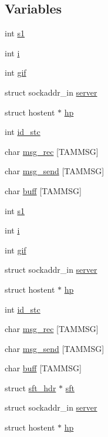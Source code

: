 \subsection*{Variables}
\begin{DoxyCompactItemize}
\item 
int \hyperlink{group__tools_gacfb6b9e2b00e34da4313b463c341e597}{s1}
\item 
int \hyperlink{group__tools_gacb559820d9ca11295b4500f179ef6392}{i}
\item 
int \hyperlink{group__tools_ga80da5edc9ed66d0e87785ab0e5d3de73}{gif}
\item 
struct sockaddr\_\-in \hyperlink{group__tools_ga437cecc27162b023659813375ca67d62}{server}
\item 
struct hostent $\ast$ \hyperlink{group__tools_gaa0f575fa3882aa394cc287edba645a35}{hp}
\item 
int \hyperlink{group__tools_gad4a4ca83bbe60e2e30bcb135a16d4ae0}{id\_\-stc}
\item 
char \hyperlink{group__tools_gaee111dc44c3bce736f7f414e0641a022}{msg\_\-rec} \mbox{[}TAMMSG\mbox{]}
\item 
char \hyperlink{group__tools_gaf535bd429e84ab4b380e215d1fda88c9}{msg\_\-send} \mbox{[}TAMMSG\mbox{]}
\item 
char \hyperlink{group__tools_gadab5417956854dcc8d2283b3d89c39de}{buff} \mbox{[}TAMMSG\mbox{]}
\item 
int \hyperlink{group__tools_gacfb6b9e2b00e34da4313b463c341e597}{s1}
\item 
int \hyperlink{group__tools_gacb559820d9ca11295b4500f179ef6392}{i}
\item 
int \hyperlink{group__tools_ga80da5edc9ed66d0e87785ab0e5d3de73}{gif}
\item 
struct sockaddr\_\-in \hyperlink{group__tools_ga437cecc27162b023659813375ca67d62}{server}
\item 
struct hostent $\ast$ \hyperlink{group__tools_gaa0f575fa3882aa394cc287edba645a35}{hp}
\item 
int \hyperlink{group__tools_gad4a4ca83bbe60e2e30bcb135a16d4ae0}{id\_\-stc}
\item 
char \hyperlink{group__tools_gaee111dc44c3bce736f7f414e0641a022}{msg\_\-rec} \mbox{[}TAMMSG\mbox{]}
\item 
char \hyperlink{group__tools_gaf535bd429e84ab4b380e215d1fda88c9}{msg\_\-send} \mbox{[}TAMMSG\mbox{]}
\item 
char \hyperlink{group__tools_gadab5417956854dcc8d2283b3d89c39de}{buff} \mbox{[}TAMMSG\mbox{]}
\item 
struct \hyperlink{structsft__hdr}{sft\_\-hdr} $\ast$ \hyperlink{group__tools_ga4f4956a7fff1361d70eee8e88bb4f7f4}{sft}
\item 
struct sockaddr\_\-in \hyperlink{group__tools_ga437cecc27162b023659813375ca67d62}{server}
\item 
struct hostent $\ast$ \hyperlink{group__tools_gaa0f575fa3882aa394cc287edba645a35}{hp}
\end{DoxyCompactItemize}


